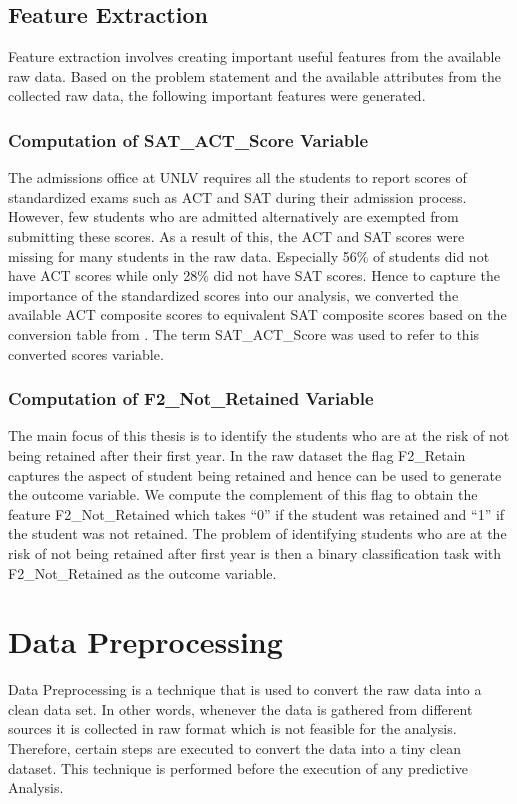 \documentclass[11pt,openright]{report}
\begin{document}
\subsection{Feature Extraction}
Feature extraction involves creating important useful features from the available raw data. Based on the problem statement and the available attributes from the collected raw data, the following important features were generated.

\subsubsection {Computation of SAT\_ACT\_Score Variable}
The admissions office at UNLV requires all the students to report scores of standardized exams such as ACT and SAT during their admission process. However, few students who are admitted alternatively are exempted from submitting these scores. As a result of this, the ACT and SAT scores were missing for many students in the raw data. Especially 56\% of students did not have ACT scores while only 28\% did not have SAT scores. Hence to capture the importance of the standardized scores into our analysis, we converted the available ACT composite scores to equivalent 
SAT composite scores based on the conversion table from \cite{ACTSAT}. The term SAT\_ACT\_Score was used to refer to this converted scores variable.

\subsubsection {Computation of F2\_Not\_Retained Variable}
The main focus of this thesis is to identify the students who are at the risk of not being retained after their first year. In the raw dataset the flag F2\_Retain captures the aspect of student being retained and hence can be used to generate the outcome variable. We compute the complement of this flag to obtain the feature F2\_Not\_Retained which takes ``0'' if the student was retained and ``1'' if the student was not retained. The problem of identifying students who are at the risk of not being retained after first year is then a binary classification task with F2\_Not\_Retained as the outcome variable.

\section {Data Preprocessing}
Data Preprocessing is a technique that is used to convert the raw data into a clean data set. In other words, whenever the data is gathered from different sources it is collected in raw format which is not feasible for the analysis.
Therefore, certain steps are executed to convert the data into a tiny clean dataset. This technique is performed before the execution of any predictive Analysis. 
\end{document}
